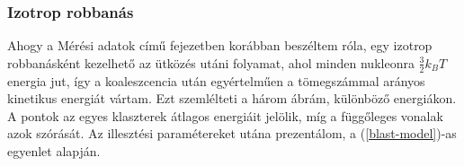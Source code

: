 \documentclass[a4paper,12pt]{article}
\begin{document}
\vspace{35mm}

\subsubsection{ Izotrop robbanás}

\vspace{5mm}

\par Ahogy a Mérési adatok című fejezetben korábban beszéltem róla, egy izotrop robbanásként kezelhető az ütközés utáni folyamat, ahol minden nukleonra $\frac{3}{2}k_{B}T$ energia jut, így a koaleszcencia után egyértelműen a tömegszámmal arányos kinetikus energiát vártam. Ezt szemlélteti a három ábrám, különböző energiákon. A pontok az egyes klaszterek átlagos energiáit jelölik, míg a függőleges vonalak azok szórását. Az illesztési paramétereket utána prezentálom, a (\ref{blast-model})-as egyenlet alapján.

\vspace{5mm}
\end{document}
